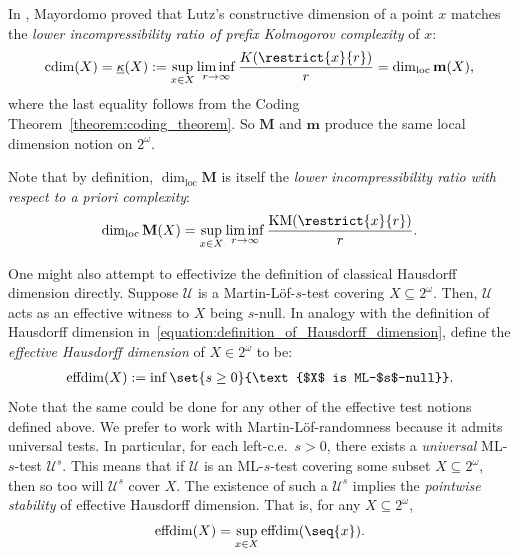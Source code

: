 In \cite{May02}, Mayordomo proved that Lutz's constructive dimension of a point $x$ matches the \textit{lower incompressibility ratio of prefix Kolmogorov complexity} of $x$: 
\begin{align*}
    \operatorname{cdim}(X) = \underline{\kappa}(X) := \sup_{x \in X} \liminf_{r \to \infty} \frac{K(\restrict{x}{r})}{r} = \dim_{\operatorname{loc}} \mathbf{m}(X),
\end{align*}
where the last equality follows from the Coding Theorem~\ref{theorem:coding_theorem}. So $\mathbf{M}$ and $\mathbf{m}$ produce the same local dimension notion on $2^\omega$. 

Note that by definition, $\dim_{\operatorname{loc}} \mathbf{M}$ is itself the \textit{lower incompressibility ratio with respect to a priori complexity}:
\begin{align*}
    \dim_{\operatorname{loc}} \mathbf{M}(X) = \sup_{x \in X} \liminf_{r \to \infty} \frac{\operatorname{KM}(\restrict{x}{r})}{r}.
\end{align*}


One might also attempt to effectivize the definition of classical Hausdorff dimension directly. Suppose $\mathcal{U}$ is a Martin-L{\"o}f-$s$-test covering $X \subseteq 2^\omega$. Then, $\mathcal{U}$ acts as an effective witness to $X$ being $s$-null. In analogy with the definition of Hausdorff dimension in~\eqref{equation:definition_of_Hausdorff_dimension}, define the \textit{effective Hausdorff dimension} of $X \in 2^\omega$ to be:
\begin{align*}
    \operatorname{effdim}(X) := \inf \set{s \geq 0}{\text{$X$ is ML-$s$-null}}.
\end{align*}
Note that the same could be done for any other of the effective test notions defined above. 
We prefer to work with Martin-L{\"o}f-randomness because it admits universal tests.
In particular, for each left-c.e.~$s > 0$, there exists a \textit{universal} ML-$s$-test $\mathcal{U}^s$. This means that if $\mathcal{U}$ is an ML-$s$-test covering some subset $X \subseteq 2^\omega$, then so too will $\mathcal{U}^s$ cover $X$. The existence of such a $\mathcal{U}^s$ implies the \textit{pointwise stability} of effective Hausdorff dimension. That is, for any $X \subseteq 2^{\omega}$,
\begin{align*}
    \operatorname{effdim}(X) = \sup_{x \in X} \operatorname{effdim}(\seq{x}).
\end{align*}

